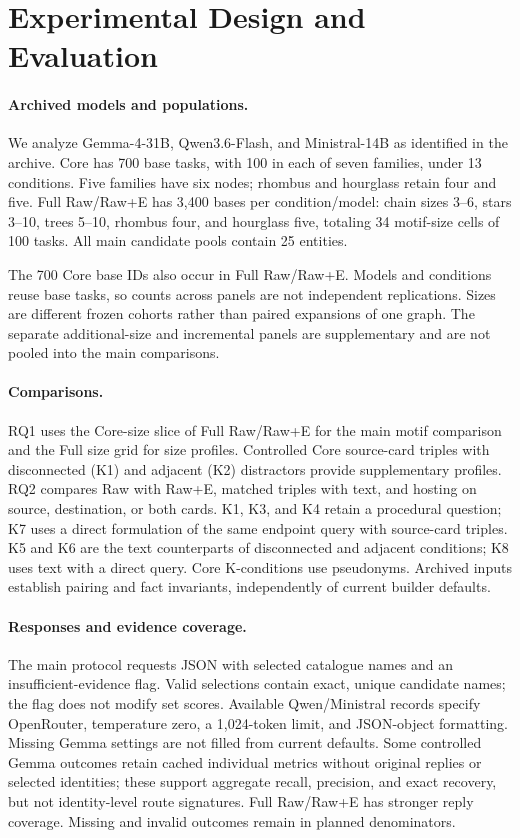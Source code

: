 \section{Experimental Design and Evaluation}
\label{sec:setup}
\paragraph{Archived models and populations.}
We analyze Gemma-4-31B, Qwen3.6-Flash, and Ministral-14B as identified in the archive. Core has 700 base tasks, with 100 in each of seven families, under 13 conditions. Five families have six nodes; rhombus and hourglass retain four and five. Full Raw/Raw+E has 3,400 bases per condition/model: chain sizes 3--6, stars 3--10, trees 5--10, rhombus four, and hourglass five, totaling 34 motif-size cells of 100 tasks. All main candidate pools contain 25 entities.

The 700 Core base IDs also occur in Full Raw/Raw+E. Models and conditions reuse base tasks, so counts across panels are not independent replications. Sizes are different frozen cohorts rather than paired expansions of one graph. The separate additional-size and incremental panels are supplementary and are not pooled into the main comparisons.

\paragraph{Comparisons.}
RQ1 uses the Core-size slice of Full Raw/Raw+E for the main motif comparison and the Full size grid for size profiles. Controlled Core source-card triples with disconnected (K1) and adjacent (K2) distractors provide supplementary profiles. RQ2 compares Raw with Raw+E, matched triples with text, and hosting on source, destination, or both cards. K1, K3, and K4 retain a procedural question; K7 uses a direct formulation of the same endpoint query with source-card triples. K5 and K6 are the text counterparts of disconnected and adjacent conditions; K8 uses text with a direct query. Core K-conditions use pseudonyms. Archived inputs establish pairing and fact invariants, independently of current builder defaults.

\paragraph{Responses and evidence coverage.}
The main protocol requests JSON with selected catalogue names and an insufficient-evidence flag. Valid selections contain exact, unique candidate names; the flag does not modify set scores. Available Qwen/Ministral records specify OpenRouter, temperature zero, a 1,024-token limit, and JSON-object formatting. Missing Gemma settings are not filled from current defaults. Some controlled Gemma outcomes retain cached individual metrics without original replies or selected identities; these support aggregate recall, precision, and exact recovery, but not identity-level route signatures. Full Raw/Raw+E has stronger reply coverage. Missing and invalid outcomes remain in planned denominators.

